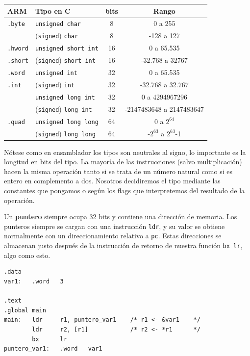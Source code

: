 \begin{descript}
\vspace{1cm}
\begin{center}
\begin{tabular}{|l|l|c|c|}\hline
 ARM & Tipo en C & bits & Rango \\ \hline
 {\tt .byte}  & {\tt unsigned char} & 8 & 0 a 255 \\
              & ({\tt signed}) {\tt char} & 8 & -128 a 127 \\ \hline
 {\tt .hword} & {\tt unsigned short int} & 16 &  0 a 65.535 \\
 {\tt .short} & ({\tt signed}) {\tt short int} & 16 & -32.768 a 32767 \\ \hline
 {\tt .word}  & {\tt unsigned int} & 32 & 0 a 65.535 \\
 {\tt .int}   & ({\tt signed}) {\tt int} &  32 & -32.768 a 32.767 \\
              & {\tt unsigned long int}  & 32 & 0 a 4294967296 \\ 
              & ({\tt signed}) {\tt long int} &  32 & -2147483648 a 2147483647 \\ \hline
 {\tt .quad}  & {\tt unsigned long long} & 64 &  0 a $2^{64}$ \\
              & ({\tt signed}) {\tt long long} & 64 & -$2^{63}$ a $2^{63}$-1 \\ \hline
\end{tabular}
\end{center}

Nótese como en ensamblador los tipos son neutrales al signo, lo importante
es la longitud en bits del tipo. La mayoría de las instrucciones (salvo
multiplicación) hacen la misma operación tanto si se trata de un número
natural como si es entero en complemento a dos. Nosotros decidiremos el tipo
mediante las constantes que pongamos o según los flags que interpretemos del
resultado de la operación.
\end{descript}


 Un {\bf puntero} siempre ocupa 32 bits y contiene
una dirección de memoria. Los punteros siempre se cargan con una instrucción
{\tt ldr}, y su valor se obtiene normalmente con un direccionamiento relativo
a {\tt pc}. Estas direcciones se almacenan justo después de la instrucción
de retorno de nuestra función {\tt bx lr}, algo como esto.

\begin{lstlisting}
.data
var1:   .word   3

.text
.global main
main:   ldr     r1, puntero_var1    /* r1 <- &var1    */
        ldr     r2, [r1]            /* r2 <- *r1      */
        bx      lr
puntero_var1:   .word   var1
\end{lstlisting}


